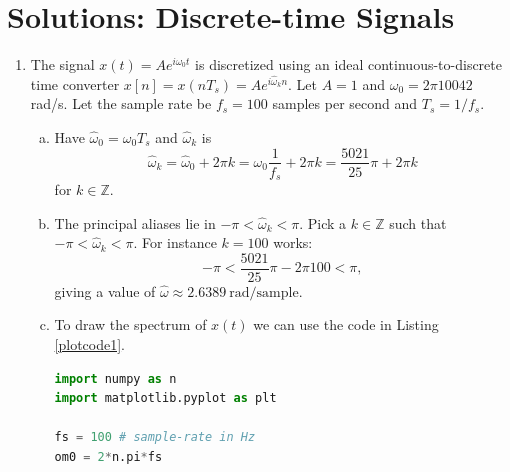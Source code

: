 \newpage
\section{Solutions: Discrete-time Signals}
\begin{enumerate}
\item The signal $x(t)=Ae^{i\omega_{0}t}$ is discretized using an ideal continuous-to-discrete time converter $x[n]=x(nT_{s})=Ae^{i\hat{\omega}_{k}n}$. Let $A=1$ and $\omega_{0}=2\pi 10042$ rad/s. Let the sample rate be $f_{s}=100$ samples per second and $T_{s}=1/f_{s}$.

\begin{enumerate}[a)]
\item Have $\hat{\omega}_{0}=\omega_{0}T_{s}$ and $\hat{\omega}_{k}$ is
$$\hat{\omega}_{k}=\hat{\omega}_{0}+2\pi k=\omega_{0}\frac{1}{f_{s}}+2\pi k=\frac{5021}{25}\pi+2\pi k$$
for $k\in\mathbb{Z}$. 

\item The principal aliases lie in $-\pi<\hat{\omega}_{k}<\pi$. Pick a $k\in\mathbb{Z}$ such that $-\pi<\hat{\omega}_{k}<\pi$. For instance $k=100$ works:
$$-\pi < \frac{5021}{25}\pi-2\pi 100 < \pi,$$
giving a value of $\hat{\omega}\approx2.6389\ \text{rad/sample}$. 

\item To draw the spectrum of $x(t)$ we can use the code in Listing \ref{plotcode1}.

\begin{lstlisting}[language=Python, caption=Spectrum of $x(t)$,label=plotcode1]
import numpy as n
import matplotlib.pyplot as plt

fs = 100 # sample-rate in Hz
om0 = 2*n.pi*fs


\end{lstlisting}
\end{enumerate}
\end{enumerate}
